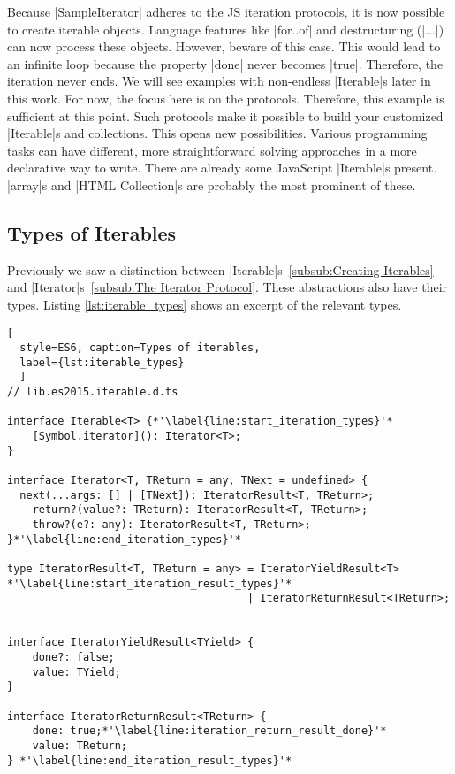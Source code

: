 Because |SampleIterator| adheres to the JS iteration protocols, it is now 
possible to create iterable objects. Language features like |for..of| and 
destructuring (|...|) can now process these objects. However, beware of this 
case. This would lead to an infinite loop because the property |done| never 
becomes |true|. Therefore, the iteration never ends. We will see examples 
with non-endless |Iterable|s later in this work. 
For now, the focus here is on the protocols. Therefore, this 
example is sufficient at this point.
\newline
Such protocols make it possible to build your customized |Iterable|s and
collections. This opens new possibilities. Various programming tasks can have 
different, more straightforward solving approaches in a more declarative way to
write.
There are already some JavaScript |Iterable|s present. |array|s and
|HTML Collection|s are probably the most prominent of these.

\subsection{Types of Iterables}
\label{sub:Types of Iterables}
Previously we saw a distinction between 
|Iterable|s~\ref{subsub:Creating Iterables} and 
|Iterator|s~\ref{subsub:The Iterator Protocol}. These abstractions also have their 
types. Listing \ref{lst:iterable_types} shows an excerpt of the relevant types.

\begin{lstlisting}[
  style=ES6, caption=Types of iterables,
  label={lst:iterable_types}
  ]
// lib.es2015.iterable.d.ts

interface Iterable<T> {*'\label{line:start_iteration_types}'*
    [Symbol.iterator](): Iterator<T>;
}

interface Iterator<T, TReturn = any, TNext = undefined> {
  next(...args: [] | [TNext]): IteratorResult<T, TReturn>;
    return?(value?: TReturn): IteratorResult<T, TReturn>;
    throw?(e?: any): IteratorResult<T, TReturn>;
}*'\label{line:end_iteration_types}'*

type IteratorResult<T, TReturn = any> = IteratorYieldResult<T> *'\label{line:start_iteration_result_types}'*
                                      | IteratorReturnResult<TReturn>;


interface IteratorYieldResult<TYield> {
    done?: false;
    value: TYield;
}

interface IteratorReturnResult<TReturn> {
    done: true;*'\label{line:iteration_return_result_done}'*
    value: TReturn;
} *'\label{line:end_iteration_result_types}'*
\end{lstlisting}

